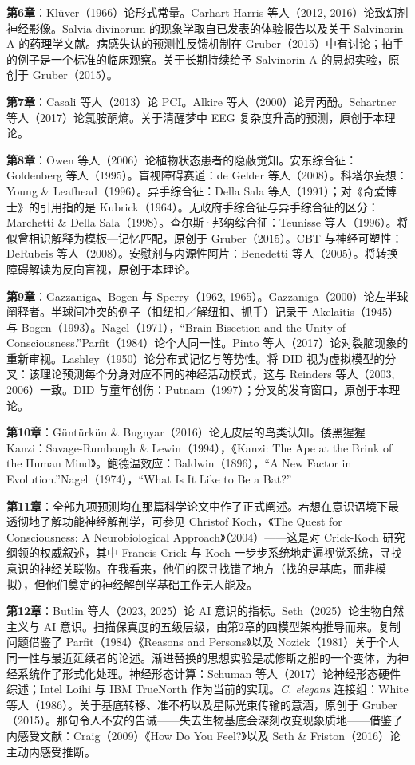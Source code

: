 \documentclass[11pt, twoside, openright]{book}
\begin{document}
\textbf{第6章}：Klüver（1966）论形式常量。Carhart-Harris 等人（2012, 2016）论致幻剂神经影像。Salvia divinorum 的现象学取自已发表的体验报告以及关于 Salvinorin A 的药理学文献。病感失认的预测性反馈机制在 Gruber（2015）中有讨论；拍手的例子是一个标准的临床观察。关于长期持续给予 Salvinorin A 的思想实验，原创于 Gruber（2015）。

\textbf{第7章}：Casali 等人（2013）论 PCI。Alkire 等人（2000）论异丙酚。Schartner 等人（2017）论氯胺酮熵。关于清醒梦中 EEG 复杂度升高的预测，原创于本理论。

\textbf{第8章}：Owen 等人（2006）论植物状态患者的隐蔽觉知。安东综合征：Goldenberg 等人（1995）。盲视障碍赛道：de Gelder 等人（2008）。科塔尔妄想：Young \& Leafhead（1996）。异手综合征：Della Sala 等人（1991）；对《奇爱博士》的引用指的是 Kubrick（1964）。无政府手综合征与异手综合征的区分：Marchetti \& Della Sala（1998）。查尔斯·邦纳综合征：Teunisse 等人（1996）。将似曾相识解释为模板---记忆匹配，原创于 Gruber（2015）。CBT 与神经可塑性：DeRubeis 等人（2008）。安慰剂与内源性阿片：Benedetti 等人（2005）。将转换障碍解读为反向盲视，原创于本理论。

\textbf{第9章}：Gazzaniga、Bogen 与 Sperry（1962, 1965）。Gazzaniga（2000）论左半球阐释者。半球间冲突的例子（扣纽扣／解纽扣、抓手）记录于 Akelaitis（1945）与 Bogen（1993）。Nagel（1971），“Brain Bisection and the Unity of Consciousness.”Parfit（1984）论个人同一性。Pinto 等人（2017）论对裂脑现象的重新审视。Lashley（1950）论分布式记忆与等势性。将 DID 视为虚拟模型的分叉：该理论预测每个分身对应不同的神经活动模式，这与 Reinders 等人（2003, 2006）一致。DID 与童年创伤：Putnam（1997）；分叉的发育窗口，原创于本理论。

\textbf{第10章}：Güntürkün \& Bugnyar（2016）论无皮层的鸟类认知。倭黑猩猩 Kanzi：Savage-Rumbaugh \& Lewin（1994），《Kanzi: The Ape at the Brink of the Human Mind》。鲍德温效应：Baldwin（1896），“A New Factor in Evolution.”Nagel（1974），“What Is It Like to Be a Bat?”

\textbf{第11章}：全部九项预测均在那篇科学论文中作了正式阐述。若想在意识语境下最透彻地了解功能神经解剖学，可参见 Christof Koch，《The Quest for Consciousness: A Neurobiological Approach》（2004）------这是对 Crick-Koch 研究纲领的权威叙述，其中 Francis Crick 与 Koch 一步步系统地走遍视觉系统，寻找意识的神经关联物。在我看来，他们的探寻找错了地方（找的是基底，而非模拟），但他们奠定的神经解剖学基础工作无人能及。

\textbf{第12章}：Butlin 等人（2023, 2025）论 AI 意识的指标。Seth（2025）论生物自然主义与 AI 意识。扫描保真度的五级层级，由第2章的四模型架构推导而来。复制问题借鉴了 Parfit（1984）《Reasons and Persons》以及 Nozick（1981）关于个人同一性与最近延续者的论述。渐进替换的思想实验是忒修斯之船的一个变体，为神经系统作了形式化处理。神经形态计算：Schuman 等人（2017）论神经形态硬件综述；Intel Loihi 与 IBM TrueNorth 作为当前的实现。\textit{C. elegans} 连接组：White 等人（1986）。关于基底转移、准不朽以及星际光束传输的意涵，原创于 Gruber（2015）。那句令人不安的告诫------失去生物基底会深刻改变现象质地------借鉴了内感受文献：Craig（2009）《How Do You Feel?》以及 Seth \& Friston（2016）论主动内感受推断。
\end{document}
